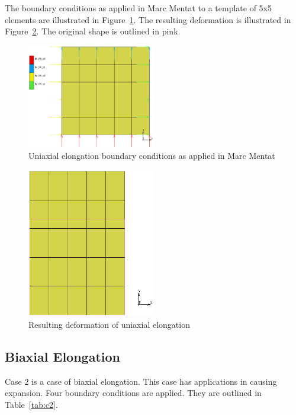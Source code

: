 The boundary conditions as applied in Marc Mentat to a template of 5x5 elements are illustrated in Figure~\ref{fig:c1bc}. The resulting deformation is illustrated in Figure~\ref{fig:c1def}. The original shape is outlined in pink.

\begin{figure}[H]
	\centering
	\includegraphics[width=0.5\textwidth]{C1BC.png}
	\caption{Uniaxial elongation boundary conditions as applied in Marc Mentat}
	\label{fig:c1bc}
\end{figure}

\begin{figure}[H]
	\centering
	\includegraphics[width=0.5\textwidth]{C1Def.png}
	\caption{Resulting deformation of uniaxial elongation}
	\label{fig:c1def}
\end{figure}

\subsection{Biaxial Elongation}

Case 2 is a case of biaxial elongation. This case has applications in causing expansion. Four boundary conditions are applied. They are outlined in Table~\ref{tab:c2}.

